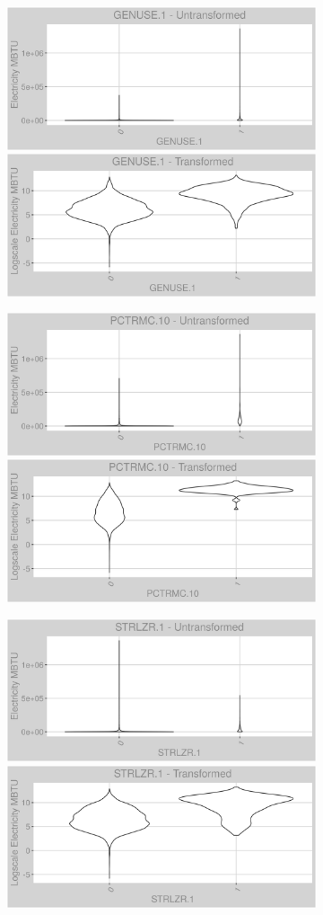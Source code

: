 \FloatBarrier
\newpage
\begin{figure}
\centering
\begin{subfigure}{1\textwidth}
\centering
\includegraphics[width=.49\textwidth, height=0.3\textheight]{Images/electricity_var_original_18.png}
\includegraphics[width=.49\textwidth, height=0.3\textheight]{Images/electricity_var_transformed_18.png}
\end{subfigure}
\begin{subfigure}{1\textwidth}
\centering
\includegraphics[width=.49\textwidth, height=0.3\textheight]{Images/electricity_var_original_19.png}
\includegraphics[width=.49\textwidth, height=0.3\textheight]{Images/electricity_var_transformed_19.png}
\end{subfigure}
\begin{subfigure}{1\textwidth}
\centering
\includegraphics[width=.49\textwidth, height=0.3\textheight]{Images/electricity_var_original_20.png}
\includegraphics[width=.49\textwidth, height=0.3\textheight]{Images/electricity_var_transformed_20.png}
\end{subfigure}
\end{figure}
\FloatBarrier
\newpage
